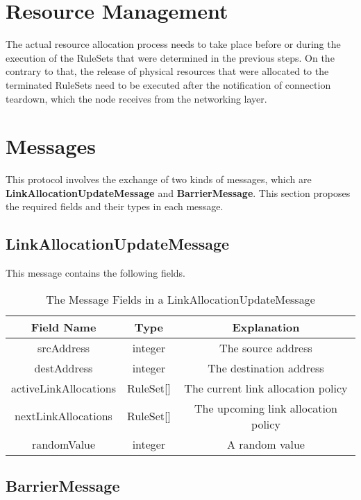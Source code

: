 \section{Resource Management}

The actual resource allocation process needs to take place before or during the execution of the RuleSets that were determined in the previous steps.
On the contrary to that, the release of physical resources that were allocated to the terminated RuleSets need to be executed after the notification of connection teardown, which the node receives from the networking layer.

\section{Messages}

This protocol involves the exchange of two kinds of messages, which are \textbf{LinkAllocationUpdateMessage} and \textbf{BarrierMessage}.
This section proposes the required fields and their types in each message.

\subsection{LinkAllocationUpdateMessage}
 
This message contains the following fields.

\begin{table}[ht]
  \begin{center}
    \begin{tabular}{|c|c|c|} \hline
      Field Name & Type & Explanation \\ \hline \cline{1-3}
      srcAddress & integer & The source address \\ \cline{1-3}
      destAddress & integer & The destination address \\ \cline{1-3}
      activeLinkAllocations & RuleSet[] & The current link allocation policy \\ \cline{1-3}
      nextLinkAllocations & RuleSet[] & The upcoming link allocation policy \\ \cline{1-3}
      randomValue & integer & A random value \\ \cline{1-3}
    \end{tabular}
    \caption{The Message Fields in a LinkAllocationUpdateMessage}
  \end{center}
\end{table}

\subsection{BarrierMessage}

